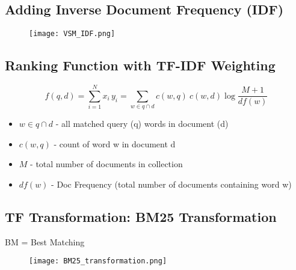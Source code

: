 \subsection{Adding Inverse Document Frequency (IDF)}
\begin{figure}[H]
    \centering
    \texttt{[image: VSM\_IDF.png]}
\end{figure}


\subsection{Ranking Function with TF-IDF Weighting}

\begin{equation*}
f(q, d) = \sum_{i=1}^N x_i \, y_i = \sum_{w \in q \cap d} c(w, q) \: c(w, d) \log \frac{M+1}{df(w)}
\end{equation*}

\begin{itemize}
\item $w \in q \cap d$ - all matched query (q) words in document (d)
\item $c(w, q)$ - count of word w in document d
\item $M$ - total number of documents in collection
\item $df(w)$ - Doc Frequency (total number of documents containing word w)
\end{itemize}



\subsection{TF Transformation: BM25 Transformation}
BM = Best Matching

\begin{figure}[H]
    \centering
    \texttt{[image: BM25\_transformation.png]}
\end{figure}



